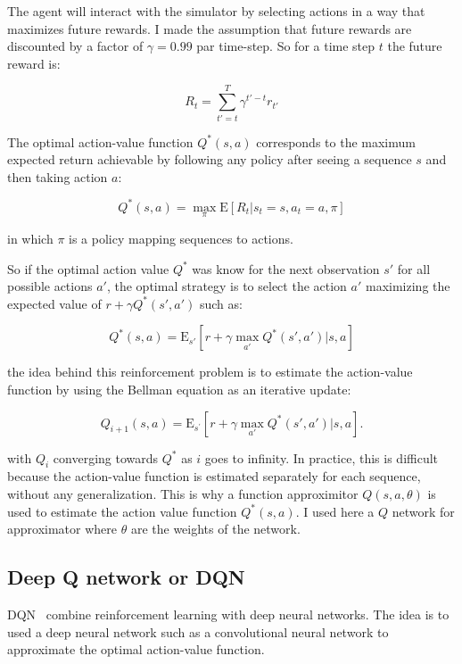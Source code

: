 \documentclass[12pt]{article}
\begin{document}
The agent will interact with the simulator by selecting actions in a way that maximizes future rewards. 
I made the assumption that future rewards are discounted by a factor of $\gamma =0.99$ par time-step. So for a time step $t$ the future reward is:

\begin{equation} 
	R_{t}=\sum_{t'=t}^T \gamma^{t'-t}r_{t'}
\end{equation} 

The optimal action-value function $Q^*(s,a)$ corresponds to the maximum expected return achievable by following any policy after seeing a sequence $s$ and then taking action $a$:

\begin{equation} 
 	Q^*(s,a)=\max_{\pi}\mathrm{E}[R_{t}|s_{t}=s,a_{t}=a,\pi]
\end{equation} 

in which $\pi$ is a policy mapping sequences to actions.

So if the optimal action value $Q^*$ was know for the next observation $s'$ for all possible actions $a'$, the optimal strategy is to select the action $a'$ maximizing the expected value of $r + \gamma Q^*(s',a')$ such as:

\begin{equation} 
 	Q^*(s,a)=\mathrm{E}_{s'}[r + \gamma \max_{a'} Q^*(s',a')|s,a]
\end{equation} 
 
the idea behind this reinforcement problem is to estimate the action-value function by using the Bellman equation as an iterative update:

\begin{equation}
	Q_{i+1}(s,a)=\mathrm{E}_{s^{'}} [r + \gamma \max_{a'} Q^{*}(s',a')|s,a].
\end{equation}

with $Q_{i}$ converging towards $Q^*$ as $i$ goes to infinity. In practice, this is difficult because the action-value function is estimated separately for each sequence, without any generalization. 
This is why a function approximitor $Q(s,a,\theta)$ is used to estimate the action value function $Q^*(s,a)$. 
I used here a $Q$ network for approximator where $\theta$ are the weights of the network.


\subsection*{Deep Q network or DQN}
DQN~\cite{mnih2015humanlevel} combine reinforcement learning with deep neural networks. 
The idea is to used a deep neural network such as a convolutional neural network to approximate the optimal action-value function.
 
\end{document}
